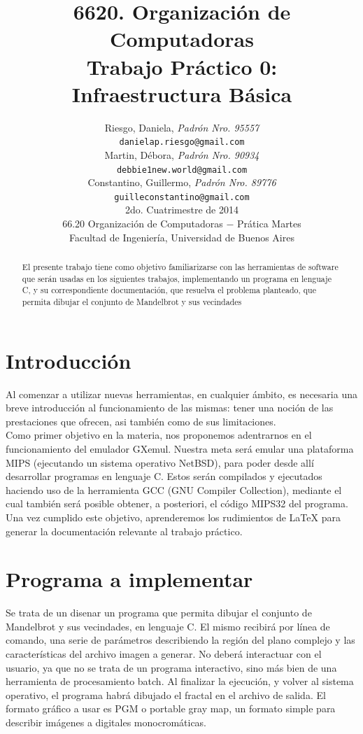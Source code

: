 \documentclass[a4paper,10pt]{article}
\title{ \textbf{ 6620. Organizaci\'on de Computadoras\\
Trabajo Pr\'actico 0: \\
Infraestructura B\'asica}}
\author{ Riesgo, Daniela, \textit{Padr\'on Nro. 95557} \\
\texttt{ danielap.riesgo@gmail.com } \\[2.5ex]
Martin, D\'ebora, \textit{Padr\'on Nro. 90934} \\
\texttt{ debbie1new.world@gmail.com } \\[2.5ex]
Constantino, Guillermo, \textit{Padr\'on Nro. 89776} \\
\texttt{ guilleconstantino@gmail.com } \\[2.5ex]
\normalsize{2do. Cuatrimestre de 2014} \\
\normalsize{66.20 Organizaci\'on de Computadoras $-$ Pr\'atica Martes} \\
\normalsize{Facultad de Ingenier\'ia, Universidad de Buenos Aires} \\
}
\date{}
\begin{document}
\maketitle
\thispagestyle{empty} %
\begin{abstract}
El presente trabajo tiene como objetivo familiarizarse con las herramientas de software que ser\'an usadas en los siguientes trabajos, implementando un programa en lenguaje C, y su correspondiente documentaci\'on, que resuelva el problema planteado, que permita dibujar el conjunto de Mandelbrot y sus vecindades

\end{abstract}

\cleardoublepage
\setcounter{page}{0}
\newpage
\tableofcontents

\newpage

\newpage

\section{Introducci\'on}
Al comenzar a utilizar nuevas herramientas, en cualquier \'ambito, es necesaria una breve introducci\'on al funcionamiento de las mismas: tener una noci\'on de las prestaciones que ofrecen, asi tambi\'en como de sus limitaciones.\\
Como primer objetivo en la materia, nos proponemos adentrarnos en el funcionamiento del emulador GXemul. Nuestra meta ser\'a emular una plataforma MIPS (ejecutando un sistema operativo NetBSD), para poder desde all\'i desarrollar programas en lenguaje C. Estos ser\'an compilados y ejecutados haciendo uso de la herramienta GCC (GNU Compiler Collection), mediante el cual tambi\'en ser\'a posible obtener, a posteriori, el c\'odigo MIPS32 del programa.\\
Una vez cumplido este objetivo, aprenderemos los rudimientos de \LaTeX{} para generar la documentaci\'on relevante al trabajo pr\'actico.




\section{Programa a implementar}
Se trata de un disenar un programa que permita dibujar el conjunto de Mandelbrot y sus vecindades, en lenguaje C.
El mismo recibir\'a por l\'inea de comando, una serie de par\'ametros describiendo la regi\'on del
plano complejo y las caracter\'isticas del archivo imagen a generar. No deber\'a interactuar con
el usuario, ya que no se trata de un programa interactivo, sino m\'as bien de una herramienta
de procesamiento batch. Al finalizar la ejecuci\'on, y volver al sistema operativo, el programa
habr\'a dibujado el fractal en el archivo de salida.
El formato gr\'afico a usar es PGM o portable gray map, un formato simple para describir im\'agenes a
digitales monocrom\'aticas.
\end{document}
